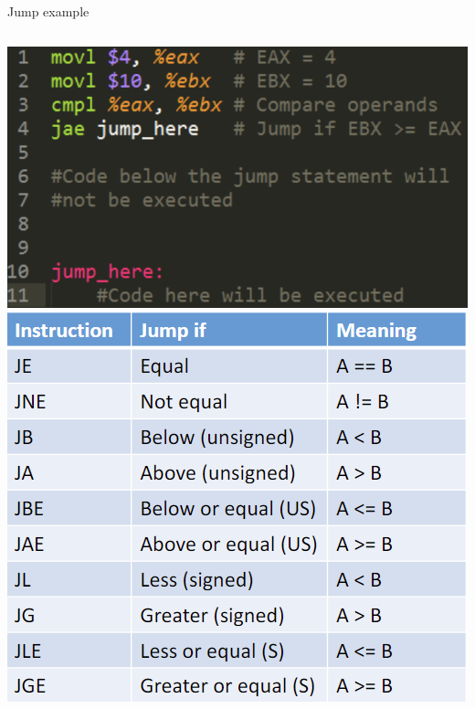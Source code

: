 \documentclass[
	11pt, %
	aspectratio=169, %
]{beamer}
\begin{document}
\begin{frame}{Jump example}{\sectiontitle}
    \begin{columns}
        \includegraphics[scale=0.4]{./images/asm-cond-jmp.png}
        \includegraphics[scale=0.4]{./images/asm-jmp.png}
    \end{columns}
\end{frame}
\end{document}
